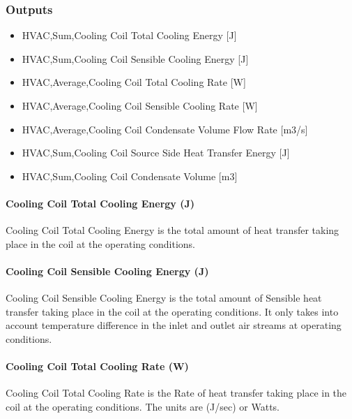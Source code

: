 \subsubsection{Outputs}\label{outputs-11-002}

\begin{itemize}
\item
  HVAC,Sum,Cooling Coil Total Cooling Energy {[}J{]}
\item
  HVAC,Sum,Cooling Coil Sensible Cooling Energy {[}J{]}
\item
  HVAC,Average,Cooling Coil Total Cooling Rate {[}W{]}
\item
  HVAC,Average,Cooling Coil Sensible Cooling Rate {[}W{]}
\item
  HVAC,Average,Cooling Coil Condensate Volume Flow Rate {[}m3/s{]}
\item
  HVAC,Sum,Cooling Coil Source Side Heat Transfer Energy {[}J{]}
\item
  HVAC,Sum,Cooling Coil Condensate Volume {[}m3{]}
\end{itemize}

\paragraph{Cooling Coil Total Cooling Energy (J)}\label{cooling-coil-total-cooling-energy-j-3}

Cooling Coil Total Cooling Energy is the total amount of heat transfer taking place in the coil at the operating conditions.

\paragraph{Cooling Coil Sensible Cooling Energy (J)}\label{cooling-coil-sensible-cooling-energy-j-3}

Cooling Coil Sensible Cooling Energy is the total amount of Sensible heat transfer taking place in the coil at the operating conditions. It only takes into account temperature difference in the inlet and outlet air streams at operating conditions.

\paragraph{Cooling Coil Total Cooling Rate (W)}\label{cooling-coil-total-cooling-rate-w-3}

Cooling Coil Total Cooling Rate is the Rate of heat transfer taking place in the coil at the operating conditions. The units are (J/sec) or Watts.

